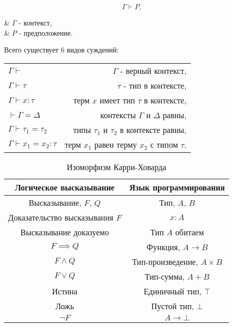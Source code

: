 \begin{equation}
    \Gamma \vdash P,
    \label{eq:judgment}
\end{equation}
\begin{eqrem}
    & $\Gamma$ - контекст, \\
    & $P$ - предположение. \\
\end{eqrem}

Всего существует 6 видов суждений:

\begin{table}[h]
    \centering
    \label{tab:types_of_judgments}
    \begin{tabular}{l r}
        $\Gamma \vdash$                  & $\Gamma$ - верный контекст,                  \\
        $\Gamma \vdash \tau$             & $\tau$ - тип в контексте,                    \\
        $\Gamma \vdash x: \tau$          & терм $x$ имеет тип $\tau$ в контексте,       \\
        $\vdash \Gamma = \Delta$         & контексты $\Gamma$ и $\Delta$ равны,         \\
        $\Gamma \vdash \tau_1 = \tau_2$  & типы $\tau_1$ и $\tau_2$ в контексте равны,  \\
        $\Gamma \vdash x_1 = x_2 : \tau$ & терм $x_1$ равен терму $x_2$ с типом $\tau$.
    \end{tabular}
\end{table}

\begin{table}[h]
    \centering
    \caption{Изоморфизм Карри-Ховарда}
    \label{tab:curry-hovard-iso}
    \begin{tabular}{|c|c|}
        \hline
        \textbf{Логическое высказывание} & \textbf{Язык программирования} \\\hline
        Высказывание, $F$, $Q$           & Тип, $A$, $B$                  \\\hline
        Доказательство высказывания $F$  & $x: A$                         \\\hline
        Высказывание доказуемо           & Тип $A$ обитаем                \\\hline
        $F \implies Q$                   & Функция, $A \to B$             \\\hline
        $F \wedge Q$                     & Тип-произведение, $A \times B$ \\\hline
        $F \vee Q$                       & Тип-сумма, $A + B$             \\\hline
        Истина                           & Единичный тип, $\top$          \\\hline
        Ложь                             & Пустой тип, $\bot$             \\\hline
        $\neg F$                         & $A \to \bot$                   \\\hline
    \end{tabular}
\end{table}

